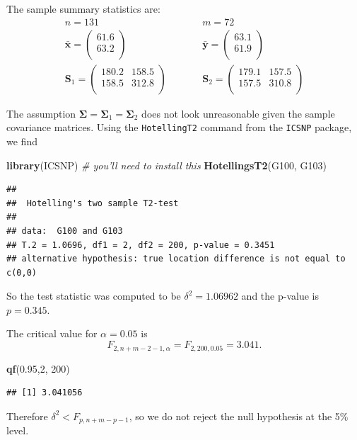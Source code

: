 \documentclass[]{book}
\newenvironment{Shaded}{\begin{snugshade}}{\end{snugshade}}
\newcommand{\CommentTok}[1]{\textcolor[rgb]{0.56,0.35,0.01}{\textit{#1}}}
\newcommand{\DecValTok}[1]{\textcolor[rgb]{0.00,0.00,0.81}{#1}}
\newcommand{\FloatTok}[1]{\textcolor[rgb]{0.00,0.00,0.81}{#1}}
\newcommand{\KeywordTok}[1]{\textcolor[rgb]{0.13,0.29,0.53}{\textbf{#1}}}
\newcommand{\NormalTok}[1]{#1}
\theoremstyle{definition}
\theoremstyle{definition}
\theoremstyle{definition}
\theoremstyle{remark}
\begin{document}
The sample summary statistics are:
\begin{eqnarray*}
n = 131 &\quad& m = 72 \\
\bar{\boldsymbol x} = \begin{pmatrix}61.6 \\63.2 \\\end{pmatrix}&\quad& \bar{\boldsymbol y}= \begin{pmatrix}63.1 \\61.9 \\\end{pmatrix}\\
\boldsymbol S_1 = \begin{pmatrix}180.2&158.5 \\158.5&312.8 \\\end{pmatrix} &\qquad& \boldsymbol S_2 = \begin{pmatrix}179.1&157.5 \\157.5&310.8 \\\end{pmatrix}
\end{eqnarray*}

The assumption \(\boldsymbol \Sigma= \boldsymbol \Sigma_1 = \boldsymbol \Sigma_2\) does not look unreasonable given the sample covariance matrices. Using the \texttt{HotellingT2} command from the \texttt{ICSNP} package, we find

\begin{Shaded}
\begin{Highlighting}[]
\KeywordTok{library}\NormalTok{(ICSNP) }\CommentTok{# you'll need to install this}
\KeywordTok{HotellingsT2}\NormalTok{(G100, G103)}
\end{Highlighting}
\end{Shaded}

\begin{verbatim}
## 
##  Hotelling's two sample T2-test
## 
## data:  G100 and G103
## T.2 = 1.0696, df1 = 2, df2 = 200, p-value = 0.3451
## alternative hypothesis: true location difference is not equal to c(0,0)
\end{verbatim}

So the test statistic was computed to be \(\delta^2 = 1.06962\) and the p-value is \(p= 0.345\).

The critical value for \(\alpha=0.05\) is
\[F_{2,n+m-2-1,\alpha} = F_{2,200,0.05} = 3.041.\]

\begin{Shaded}
\begin{Highlighting}[]
\KeywordTok{qf}\NormalTok{(}\FloatTok{0.95}\NormalTok{,}\DecValTok{2}\NormalTok{, }\DecValTok{200}\NormalTok{)}
\end{Highlighting}
\end{Shaded}

\begin{verbatim}
## [1] 3.041056
\end{verbatim}

Therefore \(\delta^2 < F_{p,n+m-p-1}\), so we do not reject the null hypothesis at the 5\% level.


\end{document}
